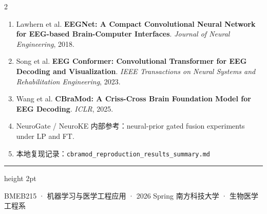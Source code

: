 \documentclass[12pt, a0paper]{article}
\renewcommand{\footnotesize}{\fontsize{15}{20}\selectfont}
\begin{document}
\begin{multicols}{2}
{\footnotesize
\begin{enumerate}[leftmargin=2em]
    \item Lawhern et al. \textbf{EEGNet: A Compact Convolutional Neural Network for EEG-based Brain-Computer Interfaces}. \textit{Journal of Neural Engineering}, 2018.
    \item Song et al. \textbf{EEG Conformer: Convolutional Transformer for EEG Decoding and Visualization}. \textit{IEEE Transactions on Neural Systems and Rehabilitation Engineering}, 2023.
    \item Wang et al. \textbf{CBraMod: A Criss-Cross Brain Foundation Model for EEG Decoding}. \textit{ICLR}, 2025.
    \item NeuroGate / NeuroKE 内部参考：neural-prior gated fusion experiments under LP and FT.
    \item 本地复现记录：\texttt{cbramod\_reproduction\_results\_summary.md}
\end{enumerate}
}

\end{multicols}

\vspace{5mm}
{\color{myblue}\hrule height 2pt}
\vspace{3mm}
\begin{center}
{\footnotesize\color{mygray}
    BMEB215 · 机器学习与医学工程应用 · 2026 Spring \hspace{3em}
    南方科技大学 · 生物医学工程系
}
\end{center}
\end{document}
